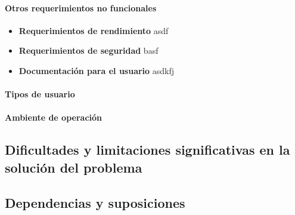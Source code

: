 \paragraph{Otros requerimientos no funcionales}
\begin{itemize}
\item \textbf{Requerimientos de rendimiento} asdf
\item \textbf{Requerimientos de seguridad} basf
\item \textbf{Documentaci\'{o}n para el usuario} asdkfj
\end{itemize}

\paragraph{Tipos de usuario}

\paragraph{Ambiente de operaci\'{o}n}

\subsection{Dificultades y limitaciones significativas en la soluci\'{o}n del problema}

\subsection{Dependencias y suposiciones}
